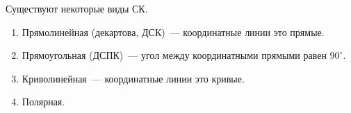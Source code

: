Существуют некоторые виды СК.

\begin{enumerate}
\item
  Прямолинейная (декартова, ДСК)~--- координатные линии это прямые.

\item
  Прямоугольная (ДСПК)~--- угол между координатными прямыми равен \(90^\circ\).

\item
  Криволинейная~--- координатные линии это кривые.

\item
  Полярная.
\end{enumerate}
